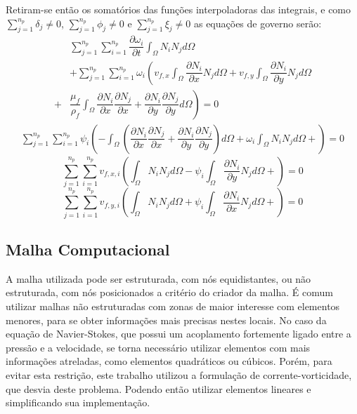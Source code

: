Retiram-se então os somatórios das funções interpoladoras das integrais, e como $\sum_{j=1}^{n_p} \delta_j \neq 0$, $\sum_{j=1}^{n_p} \phi_j \neq 0$ e $\sum_{j=1}^{n_p} \xi_j \neq 0$ as equações de governo serão:
\begin{align}
    &\sum_{j=1}^{n_p}
    \sum_{i=1}^{n_p} \dfrac{\partial \omega_i}{\partial t}
    \int_{\Omega}
    N_i N_j
    d\Omega \nonumber\\&+
    \sum_{j=1}^{n_p}
    \sum_{i=1}^{n_p}
    \omega_i
    \left(
        v_{f,x}
        \int_{\Omega}
        \dfrac{\partial N_i}{\partial x}
        N_j
        d\Omega +
        v_{f,y}
        \int_{\Omega}
        \dfrac{\partial N_i}{\partial y}
        N_j
        d\Omega \right.\nonumber\\ +& \left.
        \dfrac{\mu_f}{\rho_f}
        \int_{\Omega}
        \dfrac{\partial N_i}{\partial x}
        \dfrac{\partial N_j}{\partial x} +
        \dfrac{\partial N_i}{\partial y}
        \dfrac{\partial N_j}{\partial y}
        d\Omega
    \right) = 0
\end{align}
\begin{align}
    \sum_{j=1}^{n_p}
    \sum_{i=1}^{n_p}
    \psi_i
    \left(
        -\int_{\Omega} \left(
        \dfrac{\partial N_i}{\partial x}
        \dfrac{\partial N_j}{\partial x} +
        \dfrac{\partial N_i}{\partial y}
        \dfrac{\partial N_j}{\partial y}
        \right) d\Omega +
        \omega_i
        \int_{\Omega}
        N_i
        N_j
        d\Omega +
    \right) = 0
\end{align}
\begin{equation}
    \sum_{j=1}^{n_p}
    \sum_{i=1}^{n_p}
    v_{f,x,i}
    \left(
        \int_{\Omega}
        N_i
        N_j
        d\Omega -
        \psi_i
        \int_{\Omega}
        \dfrac{\partial N_i}{\partial y}
        N_j
        d\Omega +
    \right) = 0
\end{equation}
\begin{equation}
    \sum_{j=1}^{n_p}
    \sum_{i=1}^{n_p}
    v_{f,y,i}
    \left(
        \int_{\Omega}
        N_i
        N_j
        d\Omega +
        \psi_i
        \int_{\Omega}
        \dfrac{\partial N_i}{\partial x}
        N_j
        d\Omega +
    \right) = 0
\end{equation}

\subsection{\textbf{Malha Computacional}}
A malha utilizada pode ser estruturada, com nós equidistantes, ou não estruturada, com nós posicionados a critério do criador da malha.
É comum utilizar malhas não estruturadas com zonas de maior interesse com elementos menores, para se obter informações mais precisas nestes locais.
No caso da equação de Navier-Stokes, que possui um acoplamento fortemente ligado entre a pressão e a velocidade, se torna necessário utilizar elementos com mais informações atreladas, como elementos quadráticos ou cúbicos.
Porém, para evitar esta restrição, este trabalho utilizou a formulação de corrente-vorticidade, que desvia deste problema.
Podendo então utilizar elementos lineares e simplificando sua implementação.

